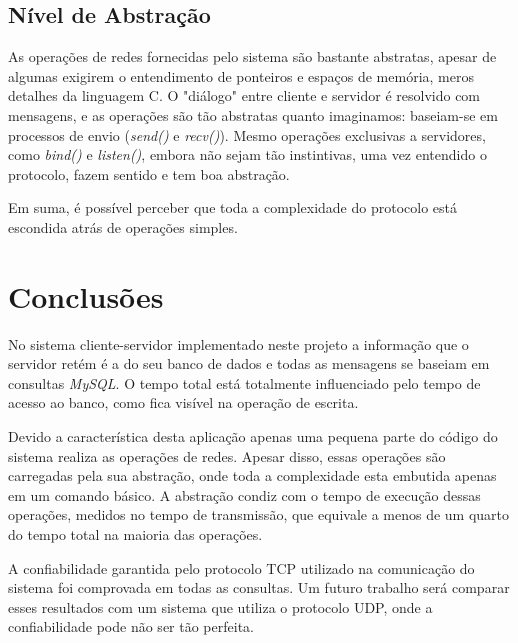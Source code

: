 \documentclass[12pt,a4paper]{article}
\begin{document}
\subsection{Nível de Abstração}

As operações de redes fornecidas pelo sistema são bastante abstratas, apesar de algumas exigirem o entendimento de ponteiros e espaços de memória, meros detalhes da linguagem C. O "diálogo" entre cliente e servidor é resolvido com mensagens, e as operações são tão abstratas quanto imaginamos: baseiam-se em processos de envio ({\it send()} e {\it recv()}). Mesmo operações exclusivas a servidores, como {\it bind()} e {\it listen()}, embora não sejam tão instintivas, uma vez entendido o protocolo, fazem sentido e tem boa abstração. 

Em suma, é possível perceber que toda a complexidade do protocolo está escondida atrás de operações simples.

\section{Conclusões}

No sistema cliente-servidor implementado neste projeto a informação que o servidor retém é a do seu banco de dados e todas as mensagens se baseiam em consultas {\it MySQL}. O tempo total está totalmente influenciado pelo tempo de acesso ao banco, como fica visível na operação de escrita.

Devido a característica desta aplicação apenas uma pequena parte do código do sistema realiza as operações de redes. Apesar disso, essas operações são carregadas pela sua abstração, onde toda a complexidade esta embutida apenas em um comando básico. A abstração condiz com o tempo de execução dessas operações, medidos no tempo de transmissão, que equivale a menos de um quarto do tempo total na maioria das operações.

A confiabilidade garantida pelo protocolo TCP utilizado na comunicação do sistema foi comprovada em todas as consultas. Um futuro trabalho será comparar esses resultados com um sistema que utiliza o protocolo UDP, onde a confiabilidade pode não ser tão perfeita.


\singlespace


\end{document}
